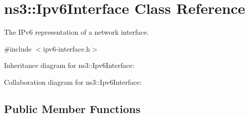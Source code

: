 \hypertarget{classns3_1_1Ipv6Interface}{}\section{ns3\+:\+:Ipv6\+Interface Class Reference}
\label{classns3_1_1Ipv6Interface}


The I\+Pv6 representation of a network interface.  




{\ttfamily \#include $<$ipv6-\/interface.\+h$>$}



Inheritance diagram for ns3\+:\+:Ipv6\+Interface\+:


Collaboration diagram for ns3\+:\+:Ipv6\+Interface\+:
\subsection*{Public Member Functions}
